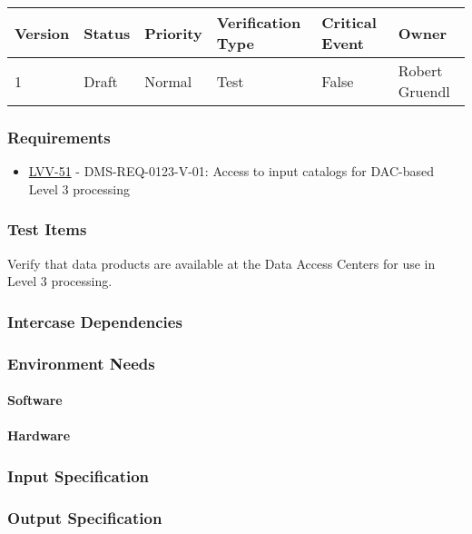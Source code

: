 \begin{longtable}[]{llllll}
\toprule
Version & Status & Priority & Verification Type & Critical Event & Owner
\\\midrule
1 & Draft & Normal &
Test & False & Robert Gruendl
\\\bottomrule
\end{longtable}

\subsubsection{Requirements}
\begin{itemize}
\item \href{https://jira.lsstcorp.org/browse/LVV-51}{LVV-51} - DMS-REQ-0123-V-01: Access to input catalogs for DAC-based Level 3 processing
\end{itemize}

\subsubsection{Test Items}
Verify that data products are available at the Data Access Centers for
use in Level 3 processing.



\subsubsection{Intercase Dependencies}

\subsubsection{Environment Needs}

\paragraph{Software}

\paragraph{Hardware}

\subsubsection{Input Specification}

\subsubsection{Output Specification}

